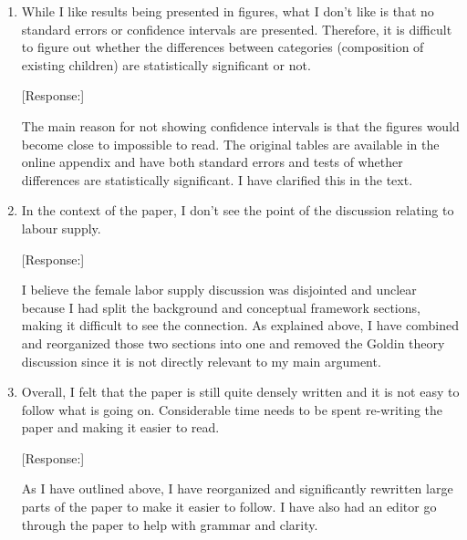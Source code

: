 \documentclass[letterpaper,12pt]{article}
\begin{document}
\begin{enumerate}
[Response:]

The 2004 break is an attempt to understand whether we observe the beginning of
a reversal in son preference and the use of sex selection as hypothesized by part of
the prior literature.
I have made two changes to make this clearer.

First, in the ``Data'' section, I have split the paragraph on the periods into two and expanded 
the discussion of the motivation for the breaks, including adding two additional
references arguing that we might see a decline in use.
The 2004/2005 break is somewhat arbitrary but does have the advantage of making 
the periods close to the same length (there are relatively few birth intervals that begin 
in 2015 and 2016).

Second, I now discuss the changes between the last two periods in more detail in the 
subsection on birth spacing with sex selection and in the Conclusion.

\item While I like results being presented in figures, what I don’t like
is that no standard errors or confidence intervals are presented.
Therefore, it is difficult to figure out whether the differences between
categories (composition of existing children) are statistically
significant or not.

[Response:]

The main reason for not showing confidence intervals is that the figures would become close 
to impossible to read. 
The original tables are available in the online appendix and have both standard 
errors and tests of whether differences are statistically significant. 
I have clarified this in the text.

\item In the context of the paper, I don’t see the point of the
discussion relating to labour supply.

[Response:]

I believe the female labor supply discussion was disjointed and unclear because I had split the 
background and conceptual framework sections, making it diﬀicult to see the connection. 
As explained above, I have combined and reorganized those two sections into one and removed 
the Goldin theory discussion since it is not directly relevant to my main argument.

\item Overall, I felt that the paper is still quite densely written and
it is not easy to follow what is going on. Considerable time needs to be
spent re-writing the paper and making it easier to read.

[Response:]

As I have outlined above, I have reorganized and significantly rewritten large parts of 
the paper to make it easier to follow. 
I have also had an editor go through the paper to help with grammar and clarity.

\end{enumerate}



\newpage


\end{document}
